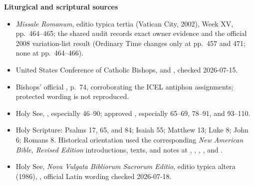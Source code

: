 \begin{deepstudy}
\textbf{Liturgical and scriptural sources}
{\footnotesize
\begin{itemize}[itemsep=0em,topsep=0.15em,parsep=0pt]
\item \emph{Missale Romanum}, editio typica tertia (Vatican City, 2002), Week XV, pp.~464--465; the shared audit records exact owner evidence and the official 2008 variation-list result (Ordinary Time changes only at pp.~457 and 471; none at pp.~464--466).
\item United States Conference of Catholic Bishops,  and , checked 2026-07-15.
\item Bishops' official , p.~74, corroborating the ICEL antiphon assignments; protected wording is not reproduced.
\item Holy See, , especially 46--90; approved , especially 65--69, 78--91, and 93--110.
\item Holy Scripture: Psalms 17, 65, and 84; Isaiah 55; Matthew 13; Luke 8; John 6; Romans 8. Historical orientation used the corresponding \emph{New American Bible, Revised Edition} introductions, texts, and notes at , , , , and .
\item Holy See, \emph{Nova Vulgata Bibliorum Sacrorum Editio}, editio typica altera (1986), , official Latin wording checked 2026-07-18.
\end{itemize}}


\end{deepstudy}
